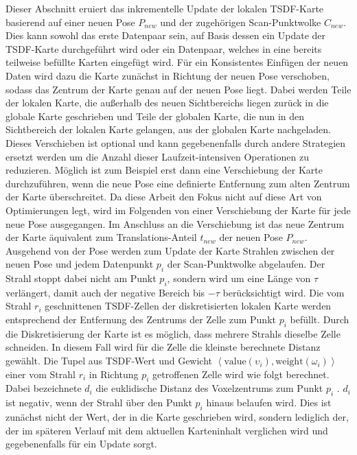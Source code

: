 Dieser Abschnitt eruiert das inkrementelle Update der lokalen TSDF-Karte basierend auf einer neuen Pose $P_{new}$ und der zugehörigen Scan-Punktwolke $C_{new}$. Dies kann sowohl das erste Datenpaar sein, auf Basis dessen ein Update der TSDF-Karte durchgeführt wird oder ein Datenpaar, welches in eine bereits teilweise befüllte Karten eingefügt wird. Für ein Konsistentes Einfügen der neuen Daten wird dazu die Karte zunächst in Richtung der neuen Pose verschoben, sodass das Zentrum der Karte genau auf der neuen Pose liegt. Dabei werden Teile der lokalen Karte, die außerhalb des neuen Sichtbereichs liegen zurück in die globale Karte geschrieben und Teile der globalen Karte, die nun in den Sichtbereich der lokalen Karte gelangen, aus der globalen Karte nachgeladen. Dieses Verschieben ist optional und kann gegebenenfalls durch andere Strategien ersetzt werden um die Anzahl dieser Laufzeit-intensiven Operationen zu reduzieren. Möglich ist zum Beispiel erst dann eine Verschiebung der Karte durchzuführen, wenn die neue Pose eine definierte Entfernung zum alten Zentrum der Karte überschreitet. Da diese Arbeit den Fokus nicht auf diese Art von Optimierungen legt, wird im Folgenden von einer Verschiebung der Karte für jede neue Pose ausgegangen. Im Anschluss an die Verschiebung ist das neue Zentrum der Karte äquivalent zum Translations-Anteil $t_{new}$ der neuen Pose $P_{new}$. Ausgehend von der Pose werden zum Update der Karte Strahlen zwischen der neuen Pose und jedem Datenpunkt $p_i$ der Scan-Punktwolke abgelaufen. Der Strahl stoppt dabei nicht am Punkt $p_i$, sondern wird um eine Länge von $\tau$ verlängert, damit auch der negative Bereich bis $-\tau$ berücksichtigt wird. Die vom Strahl $r_i$ geschnittenen TSDF-Zellen der diskretisierten lokalen Karte werden entsprechend der Entfernung des Zentrums der Zelle zum Punkt $p_i$ befüllt. Durch die Diskretisierung der Karte ist es möglich, dass mehrere Strahls dieselbe Zelle schneiden. In diesem Fall wird für die Zelle die kleinste berechnete Distanz gewählt. Die Tupel aus TSDF-Wert und Gewicht $\left\langle \text{value} \left(\upsilon_i \right), \text{weight} \left(\omega_i \right) \right\rangle$ einer vom Strahl $r_i$ in Richtung $p_i$ getroffenen Zelle wird wie folgt berechnet. Dabei bezeichnete $d_i$ die euklidische Distanz des Voxelzentrums zum Punkt $p_i$ \cite{HATSDF, Canelhas2017TruncatedSD}. $d_i$ ist negativ, wenn der Strahl über den Punkt $p_i$ hinaus belaufen wird. Dies ist zunächst nicht der Wert, der in die Karte geschrieben wird, sondern lediglich der, der im späteren Verlauf mit dem aktuellen Karteninhalt verglichen wird und gegebenenfalls für ein Update sorgt.



